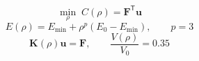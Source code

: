 \[
\min_{\rho}\; C(\rho)=\mathbf{F}^{\mathsf{T}}\mathbf{u}
\]
\[
E(\rho)=E_{\min}+\rho^{p}(E_0-E_{\min}),\qquad p=3
\]
\[
\mathbf{K}(\rho)\mathbf{u}=\mathbf{F},\qquad \frac{V(\rho)}{V_0}=0.35
\]
